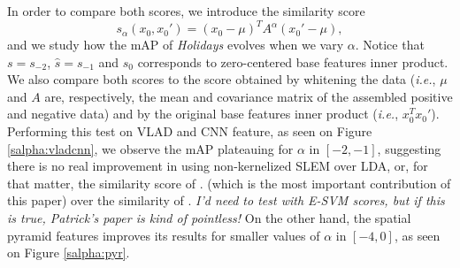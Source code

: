 \documentclass[12pt,letterpaper]{article}
\begin{document}
In order to compare both scores, we introduce the similarity score 
\begin{equation}
s_{\alpha}(x_0,x_0') = (x_0-\mu)^TA^{\alpha}(x_0'-\mu),
\end{equation}
and we study how the mAP of \emph{Holidays} evolves when we vary $\alpha$. Notice that $s=s_{-2}$, $\hat{s}=s_{-1}$ and $s_0$ corresponds to zero-centered base features inner product. We also compare both scores to the score obtained by whitening the data (\emph{i.e.}, $\mu$ and $A$ are, respectively, the mean and covariance matrix of the assembled positive and negative data) and by the original base features inner product (\emph{i.e.}, $x_0^Tx_0'$). 
Performing this test on VLAD and CNN feature, as seen on Figure \ref{salpha:vladcnn}, we observe the mAP plateauing for $\alpha$ in $[-2,-1]$, suggesting there is no real improvement in using non-kernelized SLEM over LDA, or, for that matter, the similarity score of \cite{ZePe15}. (which is the most important contribution of this paper) over the similarity of \cite{Efros11}. \emph{\color{red} I'd need to test with E-SVM scores, but if this is true, Patrick's paper is kind of pointless!}
On the other hand, the spatial pyramid features improves its results for smaller values of $\alpha$ in $[-4,0]$, as seen on Figure \ref{salpha:pyr}.
\end{document}
